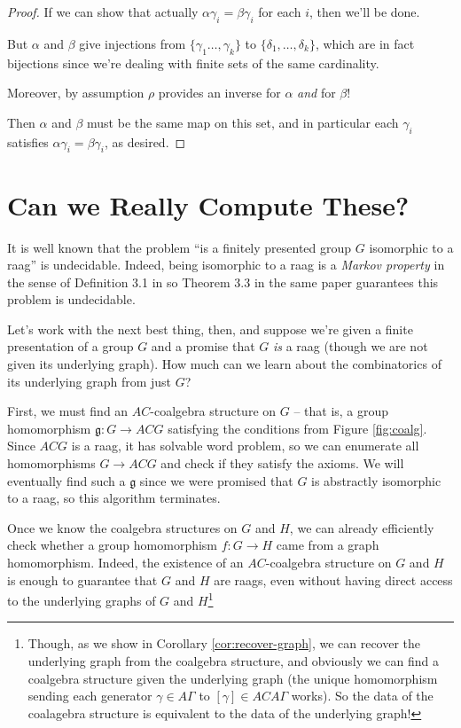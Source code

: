 \documentclass[microtype]{gtpart}
\theoremstyle{definition}
\theoremstyle{theorem}
\begin{document}
\begin{proof}
    If we can show that actually $\alpha \gamma_i = \beta \gamma_i$ for each $i$,
    then we'll be done.

    But $\alpha$ and $\beta$ give injections from $\{ \gamma_1 \ldots, \gamma_k \}$
    to $\{ \delta_1, \ldots, \delta_k \}$, which are in fact bijections since we're
    dealing with finite sets of the same cardinality. 

    Moreover, by assumption $\rho$ provides an inverse for $\alpha$ \emph{and} 
    for $\beta$!

    Then $\alpha$ and $\beta$ must be the same map on this set, and in particular
    each $\gamma_i$ satisfies $\alpha \gamma_i = \beta \gamma_i$, as desired.
\end{proof}

\section{Can we Really Compute These?}
\label{computing}

It is well known that the problem 
``is a finitely presented group $G$ isomorphic to a raag'' 
is undecidable. Indeed, being isomorphic to a raag is a 
\emph{Markov property} in the sense of Definition 3.1 in \cite{millerDecisionProblemsGroups1992}
so Theorem 3.3 in the same paper guarantees this problem is undecidable.

Let's work with the next best thing, then, and suppose we're given a 
finite presentation of a group $G$ and a promise that $G$ \emph{is} a raag 
(though we are not given its underlying graph). How much can we learn 
about the combinatorics of its underlying graph from just $G$?

First, we must find an $AC$-coalgebra structure on $G$ -- that is, a group 
homomorphism $\mathfrak{g} : G \to ACG$ satisfying the conditions from 
Figure \ref{fig:coalg}. Since $ACG$ is a raag, it has solvable word problem, so 
we can enumerate all homomorphisms $G \to ACG$ and check if they satisfy the 
axioms. We will eventually find such a $\mathfrak{g}$ since we were 
promised that $G$ is abstractly isomorphic to a raag, so this algorithm 
terminates. 

Once we know the coalgebra structures on $G$ and $H$, we can already 
efficiently check whether a group homomorphism $f : G \to H$ came from a 
graph homomorphism. Indeed, the existence of an $AC$-coalgebra 
structure on $G$ and $H$ is enough to guarantee that $G$ and $H$ are 
raags, even without having direct access to the underlying graphs of 
$G$ and $H$\footnote{Though, as we show in Corollary \ref{cor:recover-graph},
we can recover the underlying graph from the coalgebra structure, and obviously we 
can find a coalgebra structure given the underlying graph 
(the unique homomorphism sending each generator $\gamma \in A\Gamma$ to 
$[\gamma] \in ACA\Gamma$ works). So the data of the coalagebra structure 
is equivalent to the data of the underlying graph!}
\end{document}
